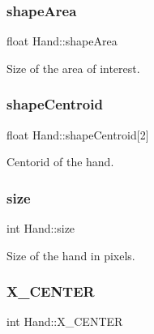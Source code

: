 \subsubsection{\texorpdfstring{shape\+Area}{shapeArea}}
{\footnotesize\ttfamily float Hand\+::shape\+Area\hspace{0.3cm}{\ttfamily [protected]}}



Size of the area of interest. 

\hypertarget{class_hand_a89099eeaa8a0286f6baae95d3b0a9f20}{}\label{class_hand_a89099eeaa8a0286f6baae95d3b0a9f20} 
\subsubsection{\texorpdfstring{shape\+Centroid}{shapeCentroid}}
{\footnotesize\ttfamily float Hand\+::shape\+Centroid\mbox{[}2\mbox{]}\hspace{0.3cm}{\ttfamily [protected]}}



Centorid of the hand. 

\hypertarget{class_hand_a11484b7843b03c2786972fec56eb2734}{}\label{class_hand_a11484b7843b03c2786972fec56eb2734} 
\subsubsection{\texorpdfstring{size}{size}}
{\footnotesize\ttfamily int Hand\+::size\hspace{0.3cm}{\ttfamily [protected]}}



Size of the hand in pixels. 

\hypertarget{class_hand_aee740c8161bd4bdd1f8f77a6d52dc65e}{}\label{class_hand_aee740c8161bd4bdd1f8f77a6d52dc65e} 
\subsubsection{\texorpdfstring{X\+\_\+\+C\+E\+N\+T\+ER}{X\_CENTER}}
{\footnotesize\ttfamily int Hand\+::\+X\+\_\+\+C\+E\+N\+T\+ER\hspace{0.3cm}{\ttfamily [protected]}}



